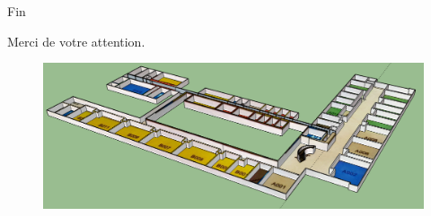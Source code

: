 \documentclass{beamer} %
\begin{document}

  \begin{frame}{Fin}
    \begin{center}
      \huge
      Merci de votre attention.
    \end{center}

    \begin{figure}
      \includegraphics[width=\linewidth, height=\textheight, keepaspectratio]{isima-perspective.png}
    \end{figure}
  \end{frame}
\end{document}
